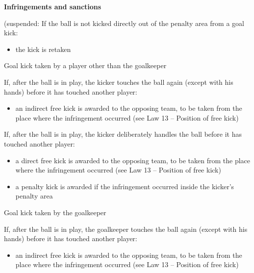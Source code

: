 \bigskip

{\bfseries Infringements and sanctions}

\headlinebox

{\color[rgb]{0.4,0.4,0.4}
(suspended: If the ball is not kicked directly out of the penalty area
from a goal kick:

\begin{itemize}
\item the kick is retaken
\end{itemize}

\bigskip

Goal kick taken by a player other than the goalkeeper

If, after the ball is in play, the kicker touches the ball again (except
with his hands) before it has touched another player:

\begin{itemize}
\item an indirect free kick is awarded to the opposing team, to be taken from
the place where the infringement occurred (see Law 13 -- Position of
free kick)
\end{itemize}

\bigskip

If, after the ball is in play, the kicker deliberately handles the ball
before it has touched another player:

\begin{itemize}
\item a direct free kick is awarded to the opposing team, to be taken from the
place where the infringement occurred (see Law 13 -- Position of free
kick)
\item a penalty kick is awarded if the infringement occurred inside the
kicker{\textquoteright}s penalty area
\end{itemize}

\bigskip

Goal kick taken by the goalkeeper

If, after the ball is in play, the goalkeeper touches the ball again
(except with his hands) before it has touched another player:

\begin{itemize}
\item an indirect free kick is awarded to the opposing team, to be taken from
the place where the infringement occurred (see Law 13 -- Position of
free kick)
\end{itemize}

\bigskip

}
